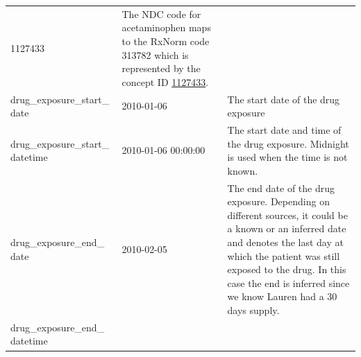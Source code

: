 \documentclass[11pt]{book}
\theoremstyle{definition}
\theoremstyle{definition}
\theoremstyle{definition}
\theoremstyle{remark}
\begin{document}
\begin{longtable}[]{@{}lll@{}}
\begin{minipage}[t]{0.15\columnwidth}
1127433\strut
\end{minipage} & \begin{minipage}[t]{0.49\columnwidth}\raggedright
The NDC code for acetaminophen maps to the RxNorm code 313782 which is represented by the concept ID \href{http://athena.ohdsi.org/search-terms/terms/1127433}{1127433}.\strut
\end{minipage}\tabularnewline
\begin{minipage}[t]{0.28\columnwidth}\raggedright
drug\_exposure\_start\_ date\strut
\end{minipage} & \begin{minipage}[t]{0.15\columnwidth}\raggedright
2010-01-06\strut
\end{minipage} & \begin{minipage}[t]{0.49\columnwidth}\raggedright
The start date of the drug exposure\strut
\end{minipage}\tabularnewline
\begin{minipage}[t]{0.28\columnwidth}\raggedright
drug\_exposure\_start\_ datetime\strut
\end{minipage} & \begin{minipage}[t]{0.15\columnwidth}\raggedright
2010-01-06 00:00:00\strut
\end{minipage} & \begin{minipage}[t]{0.49\columnwidth}\raggedright
The start date and time of the drug exposure. Midnight is used when the time is not known.\strut
\end{minipage}\tabularnewline
\begin{minipage}[t]{0.28\columnwidth}\raggedright
drug\_exposure\_end\_ date\strut
\end{minipage} & \begin{minipage}[t]{0.15\columnwidth}\raggedright
2010-02-05\strut
\end{minipage} & \begin{minipage}[t]{0.49\columnwidth}\raggedright
The end date of the drug exposure. Depending on different sources, it could be a known or an inferred date and denotes the last day at which the patient was still exposed to the drug. In this case the end is inferred since we know Lauren had a 30 days supply.\strut
\end{minipage}\tabularnewline
\begin{minipage}[t]{0.28\columnwidth}\raggedright
drug\_exposure\_end\_ datetime\strut
\end{minipage} & \begin{minipage}[t]{0.15\columnwidth}\raggedright

\end{minipage}
\end{longtable}
\end{document}

